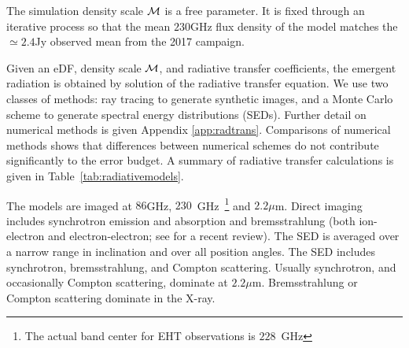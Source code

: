 The simulation density scale $\mathcal{M}$ is a free parameter.  It is fixed through an iterative process so that the mean $230$GHz flux density of the model matches the $\simeq 2.4$Jy observed mean from the 2017 campaign.


Given an eDF, density scale $\mathcal{M}$, and radiative transfer coefficients, the emergent radiation is obtained by solution of the radiative transfer equation.  We use two classes of methods: ray tracing to generate synthetic images, and a Monte Carlo scheme to generate spectral energy distributions (SEDs).  Further detail on numerical methods is given Appendix \ref{app:radtrans}.  Comparisons of numerical methods \citep[][, Prather et al. 2021]{2020ApJ...897..148G} shows that differences between numerical schemes do not contribute significantly to the error budget.  A summary of  radiative transfer calculations is given in Table~\ref{tab:radiativemodels}.

The models are imaged at $86$GHz, $230$~GHz~\footnote{The actual band center for EHT observations is $228$~GHz} and $2.2\mu$m.  Direct imaging includes synchrotron emission and absorption and bremsstrahlung (both ion-electron and electron-electron; see \citet{2020ApJ...898...50Y} for a recent review).  The SED is averaged over a narrow range in inclination and over all position angles. The SED includes synchrotron, bremsstrahlung, and Compton scattering.  Usually synchrotron, and occasionally Compton scattering, dominate at $2.2\mu$m.  Bremsstrahlung or Compton scattering dominate in the X-ray.





